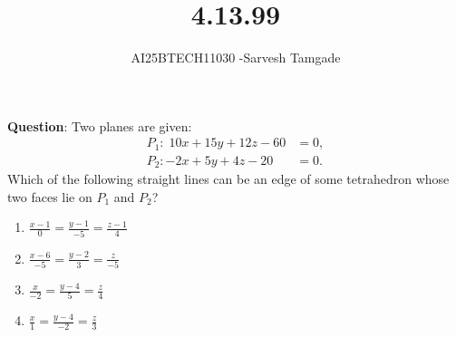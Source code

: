 \documentclass[journal]{IEEEtran}
\begin{document}

\vspace{3cm}

\title{4.13.99}
\author{AI25BTECH11030 -Sarvesh Tamgade}
{\let\newpage\relax\maketitle}

\setlength{\intextsep}{10pt} 




\textbf{Question}: Two planes are given:
\begin{align}
P_{1}:\;10x + 15y + 12z - 60 &= 0,\\
P_{2}:-2x + 5y + 4z - 20 &= 0.
\end{align}
Which of the following straight lines can be an edge of some tetrahedron whose two faces lie on $P_{1}$ and $P_{2}$?
\begin{enumerate}[label=(\alph*)]
  \item $\displaystyle \frac{x-1}{0} = \frac{y-1}{-5} = \frac{z-1}{4}$
  \item $\displaystyle \frac{x-6}{-5} = \frac{y-2}{3} = \frac{z}{-5}$
  \item $\displaystyle \frac{x}{-2} = \frac{y-4}{5} = \frac{z}{4}$
  \item $\displaystyle \frac{x}{1} = \frac{y-4}{-2} = \frac{z}{3}$
\end{enumerate}
\end{document}
